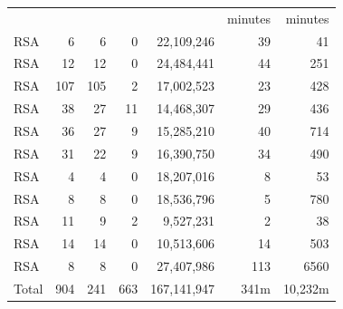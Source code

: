\begin{table}[]
\begin{threeparttable}
{\begin{tabular}{lrrrrrr}
                              &                          &                &                &             & minutes & minutes \\\cline{6-7}
            RSA\tnote{1}      & 6                        & 6              & 0              & 22,109,246  & 39      & 41      \\
            RSA\tnote{2}      & 12                       & 12             & 0              & 24,484,441  & 44      & 251     \\
            RSA\tnote{4}      & 107                      & 105            & 2              & 17,002,523  & 23      & 428     \\
            RSA\tnote{5}      & 38                       & 27             & 11             & 14,468,307  & 29      & 436     \\
            RSA\tnote{6}      & 36                       & 27             & 9              & 15,285,210  & 40      & 714     \\
            RSA\tnote{7}      & 31                       & 22             & 9              & 16,390,750  & 34      & 490     \\
            RSA\tnote{8}      & 4                        & 4              & 0              & 18,207,016  & 8       & 53      \\
            RSA\tnote{9}      & 8                        & 8              & 0              & 18,536,796  & 5       & 780     \\
            RSA\tnote{10}     & 11                       & 9              & 2              & 9,527,231   & 2       & 38      \\
            RSA\tnote{11}     & 14                       & 14             & 0              & 10,513,606  & 14      & 503     \\
            RSA\tnote{12}     & 8                        & 8              & 0              & 27,407,986  & 113     & 6560    \\

            Total             & 904                      & 241            & 663            & 167,141,947 & 341m    & 10,232m \\\hline
        \end{tabular}}
    \end{threeparttable}
    \begin{tablenotes}
        \scriptsize


\end{tablenotes}
\end{table}

